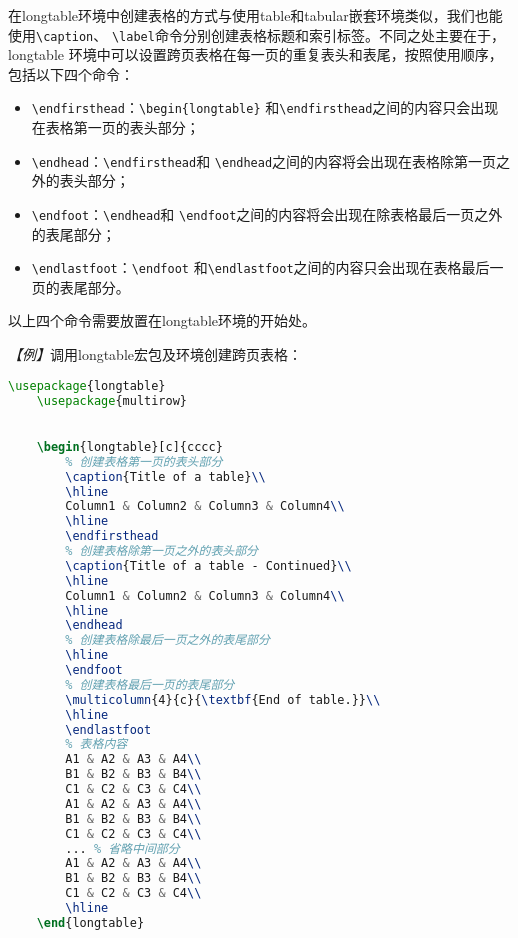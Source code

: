 在longtable环境中创建表格的方式与使用table和tabular嵌套环境类似，我们也能使用\texttt{\textbackslash{}caption}、
\texttt{\textbackslash{}label}命令分别创建表格标题和索引标签。不同之处主要在于，longtable
环境中可以设置跨页表格在每一页的重复表头和表尾，按照使用顺序，包括以下四个命令：
\begin{itemize}
    \item \texttt{\textbackslash{}endfirsthead}：\texttt{\textbackslash{}begin\{longtable\}}
          和\texttt{\textbackslash{}endfirsthead}之间的内容只会出现在表格第一页的表头部分；
    \item \texttt{\textbackslash{}endhead}：\texttt{\textbackslash{}endfirsthead}和
          \texttt{\textbackslash{}endhead}之间的内容将会出现在表格除第一页之外的表头部分；
    \item \texttt{\textbackslash{}endfoot}：\texttt{\textbackslash{}endhead}和
          \texttt{\textbackslash{}endfoot}之间的内容将会出现在除表格最后一页之外的表尾部分；
    \item \texttt{\textbackslash{}endlastfoot}：\texttt{\textbackslash{}endfoot}
          和\texttt{\textbackslash{}endlastfoot}之间的内容只会出现在表格最后一页的表尾部分。
\end{itemize}

以上四个命令需要放置在longtable环境的开始处。

\emph{【例】}调用longtable宏包及环境创建跨页表格：
\begin{lstlisting}[language=TeX]
    \usepackage{longtable}
    \usepackage{multirow}
    

    \begin{longtable}[c]{cccc}
        % 创建表格第一页的表头部分
        \caption{Title of a table}\\
        \hline
        Column1 & Column2 & Column3 & Column4\\
        \hline
        \endfirsthead
        % 创建表格除第一页之外的表头部分
        \caption{Title of a table - Continued}\\
        \hline
        Column1 & Column2 & Column3 & Column4\\
        \hline
        \endhead
        % 创建表格除最后一页之外的表尾部分
        \hline
        \endfoot
        % 创建表格最后一页的表尾部分
        \multicolumn{4}{c}{\textbf{End of table.}}\\
        \hline
        \endlastfoot
        % 表格内容
        A1 & A2 & A3 & A4\\
        B1 & B2 & B3 & B4\\
        C1 & C2 & C3 & C4\\
        A1 & A2 & A3 & A4\\
        B1 & B2 & B3 & B4\\
        C1 & C2 & C3 & C4\\
        ... % 省略中间部分
        A1 & A2 & A3 & A4\\
        B1 & B2 & B3 & B4\\
        C1 & C2 & C3 & C4\\
        \hline
    \end{longtable}
\end{lstlisting}

